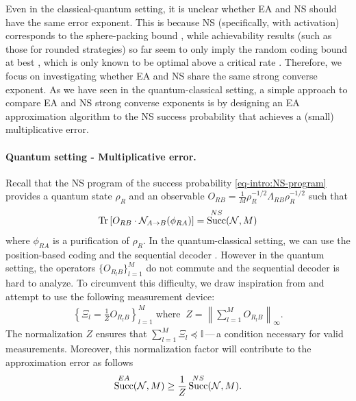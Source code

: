 \documentclass[a4paper,onecolumn,11pt,accepted=2025-10-01]{quantumarticle}
\DeclareMathOperator{\suc}{Succ}
\newcommand*{\dI}{\mathbb{I}}
\newcommand*{\cN}{\mathcal{N}}
\newcommand*{\tr}[1]{\mathrm{Tr}\left[#1\right]}
\newcommand*{\mle}{\preccurlyeq}
\begin{document}
Even in the classical-quantum setting, it is unclear whether EA and NS should have the same error exponent. This is because NS (specifically, with activation) corresponds to the sphere-packing bound \cite{Dalai2013Sep,Cheng2019Jan,Oufkir24}, while achievability results (such as those for rounded strategies) so far seem to only imply the random coding bound at best \cite{Beigi2023Oct,Li2024Jul,Renes2024Jul}, which is only known to be optimal  above a critical rate \cite{Li2024Jul,Renes2024Jul}. Therefore, we focus on investigating whether EA and NS share the same strong converse exponent. As we have seen in the quantum-classical setting, a simple approach  to compare EA and NS  strong converse exponents is by designing an EA approximation algorithm to the NS success probability that achieves a (small) multiplicative error. 

\paragraph{Quantum setting - Multiplicative error.} Recall that the NS program of the success probability \eqref{eq-intro:NS-program} provides a quantum state $\rho_R$ and an observable $O_{RB} = \frac{1}{M} \rho_R^{-1/2} \Lambda_{RB}\rho_R^{-1/2}$ such that 
\begin{equation} \label{eq-intro:success}
      \tr{O_{RB} \cdot \cN_{A\rightarrow B}(\phi_{RA})} = \suc^{\rm{NS}}(\cN,M) 
\end{equation}
where  $\phi_{RA}$ is a purification of $\rho_R$. In the quantum-classical setting, we can use the  position-based coding \cite{Anshu2018Jun} and the sequential decoder \cite{Wilde2013Sep}. However in the quantum setting,  the operators $\{O_{R_lB}\}_{l=1}^M$ do not commute and the sequential decoder is hard to analyze. To circumvent this difficulty, we draw inspiration from \cite{Fawzi19} and attempt to use  the following measurement device:
\begin{align}
    \left\{\Xi_l = \frac{1}{Z} O_{R_lB} \right\}_{l=1}^M \; \text{where} \;\; Z = \left\| \sum_{l=1}^M O_{R_lB} \right\|_\infty\!.
\end{align}
The normalization $Z$  ensures that $\sum_{l=1}^M \Xi_l \mle \dI$\,---\,a condition necessary for valid measurements. Moreover,  this normalization factor will contribute to the  approximation error as follows
\begin{align}
      \suc^{\rm{EA}}(\cN,M) \ge \frac{1}{Z}   \suc^{\rm{NS}}(\cN,M). 
\end{align}
\end{document}
